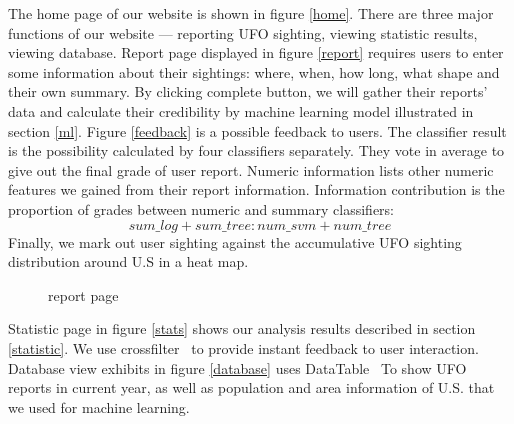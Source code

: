 The home page of our website is shown in figure \ref{home}. There are three major functions of our website --- reporting UFO sighting, viewing statistic results, viewing database. Report page displayed in figure \ref{report} requires users to enter some information about their sightings: where, when, how long, what shape and their own summary. By clicking complete button, we will gather their reports' data and calculate their credibility by machine learning model illustrated in section \ref{ml}. Figure \ref{feedback} is a possible feedback to users. The classifier result is the possibility calculated by four classifiers separately. They vote in average to give out the final grade of user report. Numeric information lists other numeric features we gained from their report information. Information contribution is the proportion of grades between numeric and summary classifiers:
$$
sum\_log + sum\_tree : num\_svm + num\_tree
$$
Finally, we mark out user sighting against the accumulative UFO sighting distribution around U.S in a heat map. 



\begin{figure}[H]
\centering 
{}
\caption{report page}
\end{figure}

Statistic page in figure \ref{stats} shows our analysis results described in section \ref{statistic}. We use crossfilter~\cite{dcjs} to provide instant feedback to user interaction. Database view exhibits in figure \ref{database} uses DataTable~\cite{datatable} To show UFO reports in current year, as well as population and area information of U.S. that we used for machine learning.
